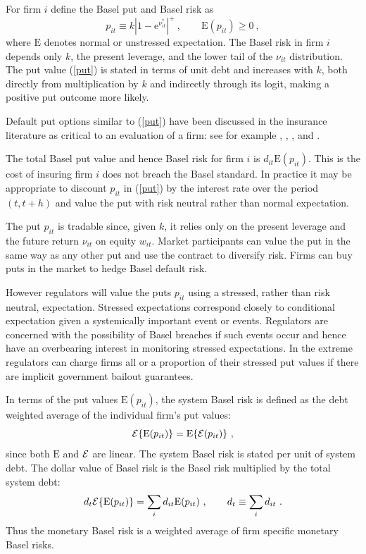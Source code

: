 \documentclass[authoryear]{elsarticle}
\newcommand{\E}{\mathrm{E}}
\newcommand{\e}{\mathrm{e}}
\newcommand{\Ex}{{\cal E}}
\newcommand{\eref}[1]{(\ref{#1})}
\newcommand{\cq}{\ , \qquad}
\newcommand{\be}[1]{\begin{equation}\label{#1}}
\newcommand{\ee}{\end{equation}}
\begin{document}
For  firm $i$ define the  Basel put and  Basel risk as 
\be{put}
p_{it}\equiv k |1-\e^{\nu^*_{it}}|^+\cq \E(p_{it})\ge 0\ ,
\ee
where $\E$ denotes normal or unstressed expectation.  The Basel risk in firm $i$ depends only $k$,  the present leverage,  and the lower tail of the  $\nu_{it}$ distribution.  The put value \eref{put} is stated in terms of unit debt and increases with $k$, both directly from  multiplication by $k$ and indirectly through its logit, making a positive put outcome more likely.  

Default put options similar to \eref{put} have been discussed in the insurance literature as critical to an evaluation of a firm:  see for
example \citet{merton1977analytic}, \citet{doherty1986price}, \citet{cummins1988risk}, \citet{myers2001capital} and \citet{sherris2006solvency}.

The total Basel put value and hence Basel risk for firm  $i$ is   $d_{it}\E(p_{it})$.   This is the cost of insuring firm $i$ does not breach the Basel standard.  In practice it may be appropriate to discount $p_{it}$ in \eref{put} by the interest rate over the period $(t,t+h)$ and value the put with risk neutral rather than normal expectation.       

The put $p_{it}$ is tradable since, given $k$, it relies only on the present leverage and the future return $\nu_{it}$ on equity $w_{it}$.  Market participants can value the put in  the same way as any other put and use the contract to diversify risk.  Firms can buy puts in the market to hedge Basel default risk.    

However regulators will value the puts $p_{it}$ using a stressed, rather than risk neutral, expectation.   Stressed expectations correspond closely to conditional expectation given a systemically important event or events.    Regulators are concerned with the possibility of Basel breaches if such events occur and hence have an overbearing interest in monitoring stressed expectations.   In the extreme regulators can charge firms all or a  proportion of their stressed put values if there are implicit government bailout guarantees.

In terms of the put values $\E(p_{it})$, the  system Basel risk is defined as the debt weighted average of the individual firm's put values:
\be{nsrisk}
\Ex\{\E(p_{it})\} = \E\{\Ex(p_{it})\}  \ , 
\ee
since both $\E$ and $\Ex$ are linear.
The  system Basel risk is stated per unit of system debt.  The dollar value of Basel risk is the Basel risk multiplied by the total system debt:
$$
d_t\Ex\{\E(p_{it})\}  = \sum_id_{it}\E(p_{it}) \cq d_t\equiv\sum_id_{it}\ .
$$
Thus the monetary  Basel risk is a  weighted average  of firm specific monetary Basel risks.  
\end{document}
